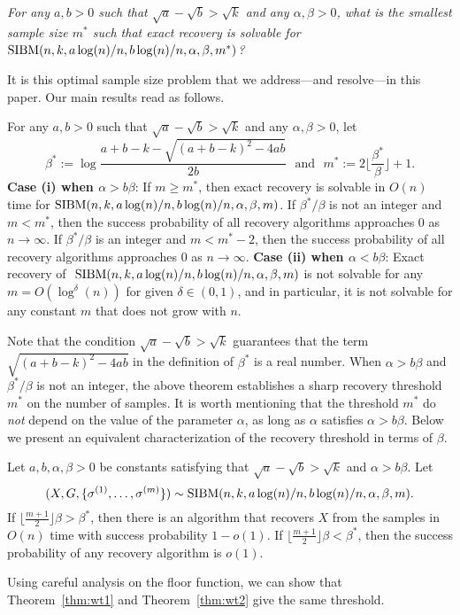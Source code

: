 \documentclass{article}
\begin{document}
\vspace*{.1in}
 \emph{For any $a,b> 0$ such that $\sqrt{a}-\sqrt{b}> \sqrt{k}$ and any $\alpha,\beta>0$, what is the smallest sample size $m^\ast$ such that exact recovery is solvable for $\operatorname{SIBM}(n,k, a\log(n)/n, b\log(n)/n,\alpha,\beta,m^\ast)$?}

\vspace*{.1in}  It is this optimal sample size problem that we address---and resolve---in this paper. 
Our main results read as follows.

\begin{theorem} \label{thm:wt1}
For any $a,b> 0$ such that $\sqrt{a}-\sqrt{b}> \sqrt{k}$ and any $\alpha,\beta>0$, let
\begin{equation} \label{eq:defstar}
\beta^\ast := 
\log\frac{a+b-k-\sqrt{(a+b-k)^2-4ab}}{2 b} \text{~~and~~}
m^\ast := 2 \Big\lfloor \frac{\beta^\ast}{\beta} \Big\rfloor +1  .
\end{equation}
{\bf Case (i) when $\alpha>b\beta$}: If $m\ge m^\ast$, then exact recovery is solvable in $O(n)$ time for $\SIBM(n,k, a\log(n)/n, \linebreak[4] b\log(n)/n,\alpha,\beta,m)$.
If $\beta^\ast/\beta$ is not an integer and $m < m^*$, then the success probability of all recovery algorithms approaches $0$ as $n\to\infty$. If $\beta^\ast/\beta$ is an integer and $m < m^* - 2$, then the success probability of all recovery algorithms approaches $0$ as $n\to\infty$.
{\bf Case (ii) when $\alpha<b\beta$}: Exact recovery of $~\operatorname{SIBM}(n,k, a\log(n)/n, b\log(n)/n,\alpha,\beta,m)$ is not solvable for any $m=O(\log^{\delta}(n))$ for given $\delta \in (0, 1)$, and in particular, it is not solvable for any constant $m$ that does not grow with $n$.
\end{theorem}
Note that the condition $\sqrt{a}-\sqrt{b} > \sqrt{k}$ guarantees that the term $\sqrt{(a+b-k)^2-4ab}$ in the definition of $\beta^\ast$ is a  real number.
When $\alpha>b\beta$ and $\beta^\ast/\beta$ is not an integer,
the above theorem establishes a sharp recovery threshold $m^\ast$ on the number of samples. It is worth mentioning that the threshold $m^\ast$ do {\em not} depend on the value of the parameter $\alpha$, as long as $\alpha$ satisfies $\alpha>b\beta$.
Below we present an equivalent characterization of the recovery threshold in terms of $\beta$.
\begin{theorem} \label{thm:wt2}
	Let $a,b,\alpha,\beta> 0$ be constants satisfying that $\sqrt{a}-\sqrt{b} > \sqrt{k}$ and $\alpha>b\beta$. 
	Let 
	$$
	(X,G,\{\sigma^{(1)},\dots,\sigma^{(m)}\}) \sim \operatorname{SIBM}(n, k, a\log(n)/n, b\log(n)/n,\alpha,\beta,m).
	$$
	If $\lfloor \frac{m+1}{2} \rfloor \beta>\beta^\ast$, then there is an algorithm that recovers $X$ from the samples in $O(n)$ time with success probability $1-o(1)$. If $\lfloor \frac{m+1}{2} \rfloor \beta <\beta^\ast$, then the success probability of any recovery algorithm is $o(1)$. 
\end{theorem}
Using careful analysis on the floor function, we can show that Theorem~\ref{thm:wt1} and Theorem~\ref{thm:wt2} give the same threshold.
\end{document}
